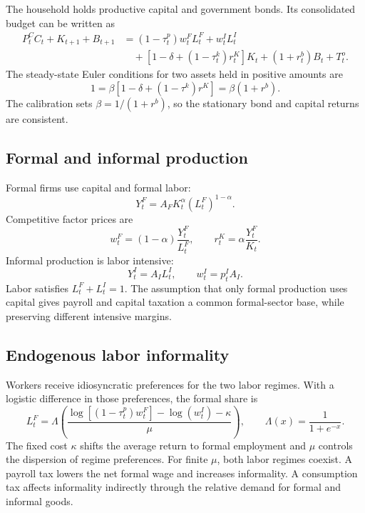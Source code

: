 \documentclass[12pt]{article}
\begin{document}
The household holds productive capital and government bonds. Its consolidated
budget can be written as
\begin{align}
 P_t^C C_t+K_{t+1}+B_{t+1}
 &=(1-\tau_t^p)w_t^F L_t^F+w_t^I L_t^I \nonumber\\
 &\quad+
 \left[1-\delta+(1-\tau_t^k)r_t^K\right]K_t
 +(1+r_t^b)B_t+T_t^o.
 \label{eq:household_budget}
\end{align}
The steady-state Euler conditions for two assets held in positive amounts are
\begin{equation}
  1=\beta\left[1-\delta+(1-\tau^k)r^K\right]
   =\beta(1+r^b).
  \label{eq:euler}
\end{equation}
The calibration sets $\beta=1/(1+r^b)$, so the stationary bond and capital
returns are consistent.

\subsection{Formal and informal production}

Formal firms use capital and formal labor:
\begin{equation}
  Y_t^F=A_FK_t^\alpha(L_t^F)^{1-\alpha}.
  \label{eq:formal_production}
\end{equation}
Competitive factor prices are
\begin{equation}
  w_t^F=(1-\alpha)\frac{Y_t^F}{L_t^F},
  \qquad
  r_t^K=\alpha\frac{Y_t^F}{K_t}.
  \label{eq:factor_prices}
\end{equation}
Informal production is labor intensive:
\begin{equation}
  Y_t^I=A_I L_t^I,
  \qquad
  w_t^I=p_t^I A_I.
  \label{eq:informal_production}
\end{equation}
Labor satisfies $L_t^F+L_t^I=1$. The assumption that only formal production
uses capital gives payroll and capital taxation a common formal-sector base,
while preserving different intensive margins.

\subsection{Endogenous labor informality}

Workers receive idiosyncratic preferences for the two labor regimes. With a
logistic difference in those preferences, the formal share is
\begin{equation}
  L_t^F=
  \Lambda\left(
    \frac{
      \log[(1-\tau_t^p)w_t^F]-\log(w_t^I)-\kappa
    }{\mu}
  \right),
  \qquad
  \Lambda(x)=\frac{1}{1+e^{-x}}.
  \label{eq:formal_choice}
\end{equation}
The fixed cost $\kappa$ shifts the average return to formal employment and
$\mu$ controls the dispersion of regime preferences. For finite $\mu$, both
labor regimes coexist. A payroll tax lowers the net formal wage and increases
informality. A consumption tax affects informality indirectly through the
relative demand for formal and informal goods.
\end{document}

